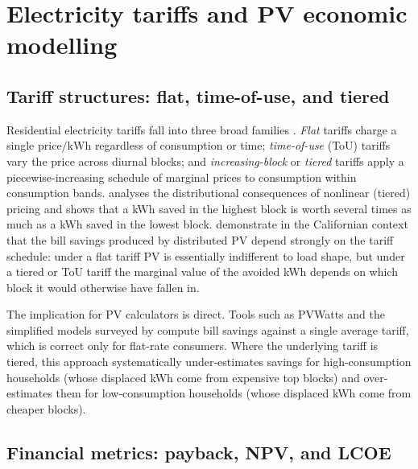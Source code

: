 \section{Electricity tariffs and PV economic modelling}
\label{sec:lit-tariff}

\subsection{Tariff structures: flat, time-of-use, and tiered}
\label{sec:lit-tariff-structures}

Residential electricity tariffs fall into three broad families
\citep{bhattacharyya2019}. \emph{Flat} tariffs charge a single
$\mathrm{price/kWh}$ regardless of consumption or time;
\emph{time-of-use} (ToU) tariffs vary the price across diurnal blocks;
and \emph{increasing-block} or \emph{tiered} tariffs apply a
piecewise-increasing schedule of marginal prices to consumption
within consumption bands. \citet{borenstein2012} analyses the
distributional consequences of nonlinear (tiered) pricing and shows
that a kWh saved in the highest block is worth several times as much
as a kWh saved in the lowest block. \citet{darghouth2011} demonstrate
in the Californian context that the bill savings produced by
distributed PV depend strongly on the tariff schedule: under a
flat tariff PV is essentially indifferent to load shape, but under a
tiered or ToU tariff the marginal value of the avoided kWh depends on
which block it would otherwise have fallen in.

The implication for PV calculators is direct. Tools such as PVWatts
\citep{pvwatts2014} and the simplified models surveyed by
\citet{audenaert2010} compute bill savings against a single average
tariff, which is correct only for flat-rate consumers. Where the
underlying tariff is tiered, this approach systematically
under-estimates savings for high-consumption households (whose
displaced kWh come from expensive top blocks) and over-estimates them
for low-consumption households (whose displaced kWh come from cheaper
blocks).

\subsection{Financial metrics: payback, NPV, and LCOE}
\label{sec:lit-tariff-metrics}

